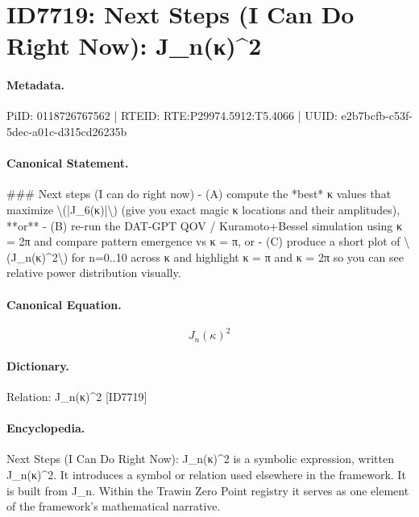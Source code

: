 \section*{ID7719: Next Steps (I Can Do Right Now): J\_n(κ)\textasciicircum{}2}
\paragraph{Metadata.}
PiID: 0118726767562 | RTEID: RTE:P29974.5912:T5.4066 | UUID: e2b7bcfb-c53f-5dec-a01c-d315cd26235b

\paragraph{Canonical Statement.}
\#\#\# Next steps (I can do right now) - (A) compute the *best* κ values that maximize \textbackslash{}(|J\_6(κ)|\textbackslash{}) (give you exact magic κ locations and their amplitudes), **or** - (B) re-run the DAT-GPT QOV / Kuramoto+Bessel simulation using κ = 2π and compare pattern emergence vs κ = π, or - (C) produce a short plot of \textbackslash{}(J\_n(κ)\textasciicircum{}2\textbackslash{}) for n=0..10 across κ and highlight κ = π and κ = 2π so you can see relative power distribution visually.

\paragraph{Canonical Equation.}
\[
J_n(κ)^2
\]

\paragraph{Dictionary.}
Relation: J\_n(κ)\textasciicircum{}2 [ID7719]

\paragraph{Encyclopedia.}
Next Steps (I Can Do Right Now): J\_n(κ)\textasciicircum{}2 is a symbolic expression, written J\_n(κ)\textasciicircum{}2. It introduces a symbol or relation used elsewhere in the framework. It is built from J\_n. Within the Trawin Zero Point registry it serves as one element of the framework's mathematical narrative.
